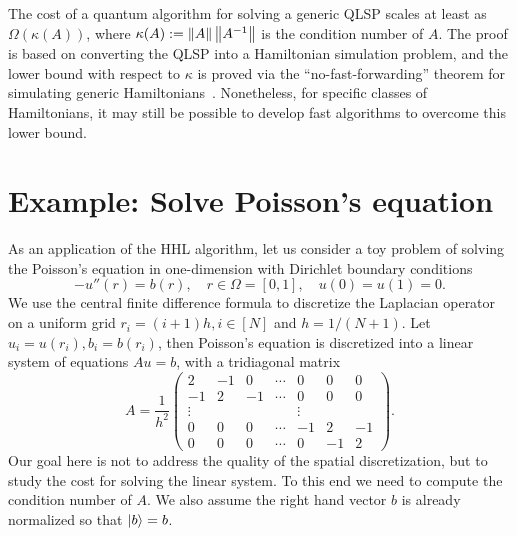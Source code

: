 \begin{rem}
The cost of a quantum algorithm for solving a generic QLSP scales at least as $\Omega(\kappa(A))$, where $\kappa(A):=\left\lVert A\right\rVert\left\lVert A^{-1}\right\rVert$ is the condition number of $A$.
The proof is based on converting the QLSP into a Hamiltonian simulation problem, and the lower bound with respect to $\kappa$ is proved via the ``no-fast-forwarding'' theorem for simulating generic Hamiltonians~\cite{HarrowHassidimLloyd2009}.
Nonetheless, for specific classes of Hamiltonians, it may still be possible to develop fast algorithms to overcome this lower bound.
\end{rem}

\section{Example: Solve Poisson's equation}\label{sec:poisson_hhl}

As an application of the HHL algorithm, let us consider a toy problem of solving the Poisson's equation in one-dimension with Dirichlet boundary conditions
\begin{equation}
-u''(r)=b(r), \quad r\in \Omega=[0,1], \quad u(0)=u(1)=0.
\end{equation}
We use the central finite difference formula to discretize the Laplacian operator on a uniform grid $r_i=(i+1)h,i\in[N]$ and $h=1/(N+1)$.
Let $u_i=u(r_i), b_i=b(r_i)$, then  Poisson's equation is discretized into a linear system of equations $Au=b$, with a tridiagonal matrix
\begin{equation}
A=\frac{1}{h^2}\begin{pmatrix}
2 & -1 & 0 & \cdots & 0 & 0 & 0\\
-1 &  2 & -1 & \cdots & 0 & 0 & 0\\
\vdots &&  &&       \vdots\\
0 & 0 & 0  &  \cdots & -1 & 2 & -1\\
0 & 0 & 0  &  \cdots & 0 & -1 & 2
\end{pmatrix}.
\label{eqn:A_tridiagonal}
\end{equation}
Our goal here is not to address the quality of the spatial discretization, but to study the cost for solving the linear system.
To this end we need to compute the condition number of $A$.
We also assume the right hand vector $b$ is already normalized so that $\ket{b}=b$.

